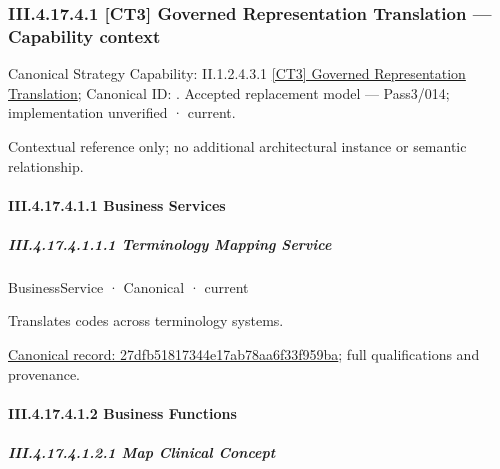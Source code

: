 \subsubsection*{III.4.17.4.1 [CT3] Governed Representation Translation — Capability context}
\label{navigation:III.4.17.4.1}

{\small Canonical Strategy Capability: II.1.2.4.3.1 \hyperref[element:bfaeedaf94c54505bc0616e4653b5767]{[CT3] Governed Representation Translation}; Canonical ID: \texttt{}. Accepted replacement model — Pass3/014; implementation unverified · current.}\par
Contextual reference only; no additional architectural instance or semantic relationship.\par
\paragraph*{III.4.17.4.1.1 Business Services}
\label{navigation:III.4.17.4.1.1}

\subparagraph*{III.4.17.4.1.1.1 Terminology Mapping Service}
\label{navigation:III.4.17.4.1.1.1}

\label{element:27dfb51817344e17ab78aa6f33f959ba}
{\small BusinessService · Canonical · current}\par

Translates codes across terminology systems.


{\footnotesize \href{../../../../../../../../continuum/business/business-service/27dfb51817344e17ab78aa6f33f959ba.md}{Canonical record: 27dfb51817344e17ab78aa6f33f959ba}; full qualifications and provenance.}\par
\paragraph*{III.4.17.4.1.2 Business Functions}
\label{navigation:III.4.17.4.1.2}

\subparagraph*{III.4.17.4.1.2.1 Map Clinical Concept}
\label{navigation:III.4.17.4.1.2.1}

